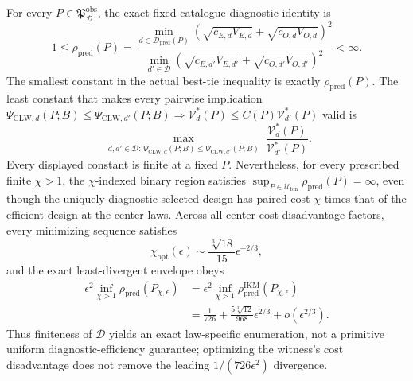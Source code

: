 For every \(P\in\mathfrak P_{\mathcal D}^{\mathrm{obs}}\), the exact fixed-catalogue diagnostic identity is
\[
 1\le\rho_{\mathrm{pred}}(P)
 =\frac{\min_{d\in\mathcal D_{\mathrm{pred}}(P)}
 (\sqrt{c_{E,d}V_{E,d}}+\sqrt{c_{O,d}V_{O,d}})^2}
 {\min_{d'\in\mathcal D}
 (\sqrt{c_{E,d'}V_{E,d'}}+\sqrt{c_{O,d'}V_{O,d'}})^2}<\infty.
\]
The smallest constant in the actual best-tie inequality is exactly \(\rho_{\mathrm{pred}}(P)\). The least constant that makes every pairwise implication
\(\Psi_{\mathrm{CLW},d}(P;B)\le\Psi_{\mathrm{CLW},d'}(P;B)\Rightarrow \mathcal V_d^*(P)\le C(P)\mathcal V_{d'}^*(P)\)
valid is
\[
 \max_{\substack{d,d'\in\mathcal D:\,
 \Psi_{\mathrm{CLW},d}(P;B)\le\Psi_{\mathrm{CLW},d'}(P;B)}}
 \frac{\mathcal V_d^*(P)}{\mathcal V_{d'}^*(P)}.
\]
Every displayed constant is finite at a fixed \(P\). Nevertheless, for every prescribed finite \(\chi>1\), the \(\chi\)-indexed binary region satisfies \(\sup_{P\in\mathcal U_{\mathrm{bin}}}\rho_{\mathrm{pred}}(P)=\infty\), even though the uniquely diagnostic-selected design has paired cost \(\chi\) times that of the efficient design at the center laws. Across all center cost-disadvantage factors, every minimizing sequence satisfies
\[
 \chi_{\mathrm{opt}}(\epsilon)
 \sim\frac{\sqrt[3]{18}}{15}\epsilon^{-2/3},
\]
and the exact least-divergent envelope obeys
\[
\begin{aligned}
 \epsilon^2\inf_{\chi>1}\rho_{\mathrm{pred}}(P_{\chi,\epsilon})
 &=\epsilon^2\inf_{\chi>1}\rho_{\mathrm{pred}}^{\mathrm{IKM}}(P_{\chi,\epsilon})\\
 &=\frac1{726}+\frac{5\sqrt[3]{12}}{968}\epsilon^{2/3}
 +o(\epsilon^{2/3}).
\end{aligned}
\]
Thus finiteness of \(\mathcal D\) yields an exact law-specific enumeration, not a primitive uniform diagnostic-efficiency guarantee; optimizing the witness's cost disadvantage does not remove the leading \(1/(726\epsilon^2)\) divergence.